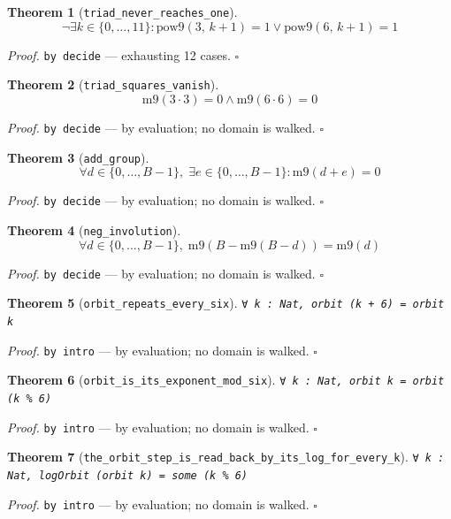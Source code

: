 \documentclass[11pt]{article}
\newtheorem{theorem}{Theorem}[section]
\begin{document}
\begin{theorem}[\texttt{triad\_never\_reaches\_one}]
\[ \lnot \exists k \in \{0,\dots,11\} : \mathrm{pow9}\mathopen{}\left(3,\,k + 1\right) = 1 \lor \mathrm{pow9}\mathopen{}\left(6,\,k + 1\right) = 1 \]
\end{theorem}
\noindent\emph{Proof.} \texttt{by decide} --- exhausting 12 cases. \hfill$\square$

\begin{theorem}[\texttt{triad\_squares\_vanish}]
\[ \mathrm{m9}\mathopen{}\left(3 \cdot 3\right) = 0 \land \mathrm{m9}\mathopen{}\left(6 \cdot 6\right) = 0 \]
\end{theorem}
\noindent\emph{Proof.} \texttt{by decide} --- by evaluation; no domain is walked. \hfill$\square$

\begin{theorem}[\texttt{add\_group}]
\[ \forall d \in \{0,\dots,B-1\},\; \exists e \in \{0,\dots,B-1\} : \mathrm{m9}\mathopen{}\left(d + e\right) = 0 \]
\end{theorem}
\noindent\emph{Proof.} \texttt{by decide} --- by evaluation; no domain is walked. \hfill$\square$

\begin{theorem}[\texttt{neg\_involution}]
\[ \forall d \in \{0,\dots,B-1\},\; \mathrm{m9}\mathopen{}\left(B - \mathrm{m9}\mathopen{}\left(B - d\right)\right) = \mathrm{m9}\mathopen{}\left(d\right) \]
\end{theorem}
\noindent\emph{Proof.} \texttt{by decide} --- by evaluation; no domain is walked. \hfill$\square$

\begin{theorem}[\texttt{orbit\_repeats\_every\_six}]
\texttt{∀ k : Nat, orbit (k + 6) = orbit k}
\end{theorem}
\noindent\emph{Proof.} \texttt{by
  intro} --- by evaluation; no domain is walked. \hfill$\square$

\begin{theorem}[\texttt{orbit\_is\_its\_exponent\_mod\_six}]
\texttt{∀ k : Nat, orbit k = orbit (k \% 6)}
\end{theorem}
\noindent\emph{Proof.} \texttt{by
  intro} --- by evaluation; no domain is walked. \hfill$\square$

\begin{theorem}[\texttt{the\_orbit\_step\_is\_read\_back\_by\_its\_log\_for\_every\_k}]
\texttt{∀ k : Nat, logOrbit (orbit k) = some (k \% 6)}
\end{theorem}
\noindent\emph{Proof.} \texttt{by
  intro} --- by evaluation; no domain is walked. \hfill$\square$
\end{document}
